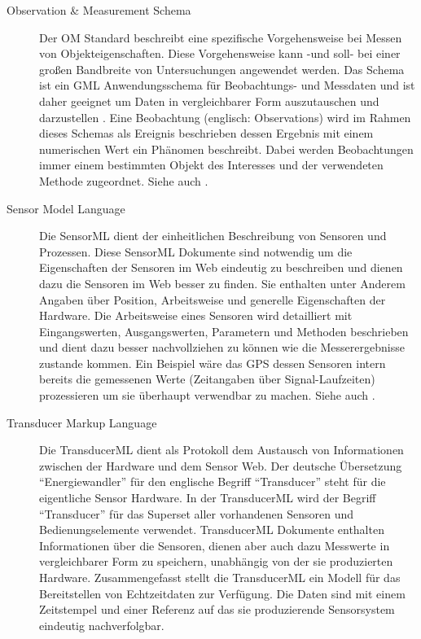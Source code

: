 \begin{description}
\item[Observation \& Measurement Schema] Der \gls{OM} Standard beschreibt eine spezifische Vorgehensweise bei Messen von Objekteigenschaften. Diese Vorgehensweise kann -und soll- bei einer großen Bandbreite von Untersuchungen angewendet werden. Das Schema ist ein \gls{GML} Anwendungsschema für Beobachtungs- und Messdaten und ist daher geeignet um Daten in vergleichbarer Form auszutauschen und darzustellen \citep{kraak_what_2005}. Eine Beobachtung (englisch: Observations) wird im Rahmen dieses Schemas als Ereignis beschrieben dessen Ergebnis mit einem numerischen Wert ein Phänomen beschreibt. Dabei werden Beobachtungen immer einem bestimmten Objekt des Interesses und der verwendeten Methode zugeordnet. Siehe auch \citep{cox_observations_2011}.
\item[Sensor Model Language] Die \gls{SensorML} dient der einheitlichen Beschreibung von Sensoren und Prozessen. Diese \gls{SensorML} Dokumente sind notwendig um die Eigenschaften der Sensoren im Web eindeutig zu beschreiben und dienen dazu die Sensoren im Web besser zu finden. Sie enthalten unter Anderem Angaben über Position, Arbeitsweise und generelle Eigenschaften der Hardware. Die Arbeitsweise eines Sensoren wird detailliert mit Eingangswerten, Ausgangswerten, Parametern und Methoden beschrieben und dient dazu besser nachvollziehen zu können wie die Messerergebnisse zustande kommen. Ein Beispiel wäre das \gls{GPS} dessen Sensoren intern bereits die gemessenen Werte (Zeitangaben über Signal-Laufzeiten) prozessieren um sie überhaupt verwendbar zu machen. Siehe auch \citep{botts_opengis_2007}.
\item[Transducer Markup Language] Die \gls{TransducerML} dient als Protokoll dem Austausch von Informationen zwischen der Hardware und dem Sensor Web. Der deutsche Übersetzung ``Energiewandler'' für den englische Begriff ``Transducer'' steht für die eigentliche Sensor Hardware. In der \gls{TransducerML} wird der Begriff ``Transducer'' für das Superset aller vorhandenen Sensoren und Bedienungselemente verwendet. 
\gls{TransducerML} Dokumente enthalten Informationen über die Sensoren, dienen aber auch dazu Messwerte in vergleichbarer Form zu speichern, unabhängig von der sie produzierten Hardware. Zusammengefasst stellt die \gls{TransducerML} ein Modell für das Bereitstellen von Echtzeitdaten zur Verfügung. Die Daten sind mit einem Zeitstempel und einer Referenz auf das sie produzierende Sensorsystem eindeutig nachverfolgbar.

\end{description}
